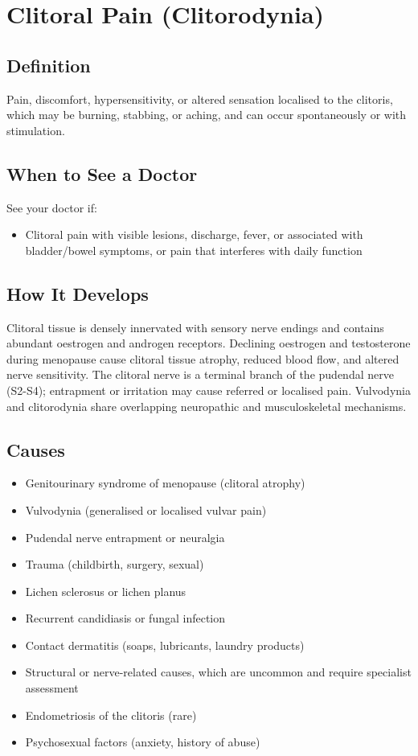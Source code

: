 \chapter{Clitoral Pain (Clitorodynia)}

\section*{Definition}
Pain, discomfort, hypersensitivity, or altered sensation localised to the clitoris, which may be burning, stabbing, or aching, and can occur spontaneously or with stimulation.

\section*{When to See a Doctor}
See your doctor if:
\begin{itemize}
  \item Clitoral pain with visible lesions, discharge, fever, or associated with bladder/bowel symptoms, or pain that interferes with daily function
\end{itemize}

\section*{How It Develops}
Clitoral tissue is densely innervated with sensory nerve endings and contains abundant oestrogen and androgen receptors. Declining oestrogen and testosterone during menopause cause clitoral tissue atrophy, reduced blood flow, and altered nerve sensitivity. The clitoral nerve is a terminal branch of the pudendal nerve (S2-S4); entrapment or irritation may cause referred or localised pain. Vulvodynia and clitorodynia share overlapping neuropathic and musculoskeletal mechanisms.

\section*{Causes}
\begin{itemize}
  \item Genitourinary syndrome of menopause (clitoral atrophy)
  \item Vulvodynia (generalised or localised vulvar pain)
  \item Pudendal nerve entrapment or neuralgia
  \item Trauma (childbirth, surgery, sexual)
  \item Lichen sclerosus or lichen planus
  \item Recurrent candidiasis or fungal infection
  \item Contact dermatitis (soaps, lubricants, laundry products)
  \item Structural or nerve-related causes, which are uncommon and require specialist assessment
  \item Endometriosis of the clitoris (rare)
  \item Psychosexual factors (anxiety, history of abuse)
\end{itemize}

